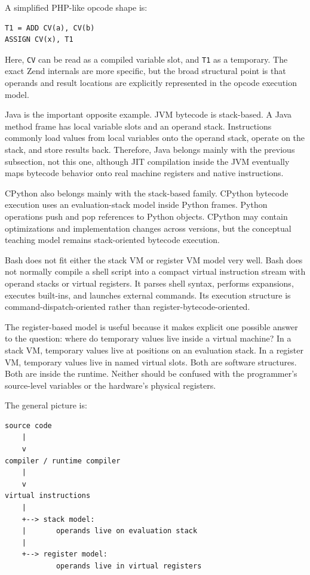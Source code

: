 A simplified PHP-like opcode shape is:

\begin{verbatim}
T1 = ADD CV(a), CV(b)
ASSIGN CV(x), T1
\end{verbatim}

Here, \texttt{CV} can be read as a compiled variable slot, and \texttt{T1} as a temporary. The exact Zend internals are more specific, but the broad structural point is that operands and result locations are explicitly represented in the opcode execution model.

Java is the important opposite example. JVM bytecode is stack-based. A Java method frame has local variable slots and an operand stack. Instructions commonly load values from local variables onto the operand stack, operate on the stack, and store results back. Therefore, Java belongs mainly with the previous subsection, not this one, although JIT compilation inside the JVM eventually maps bytecode behavior onto real machine registers and native instructions.

CPython also belongs mainly with the stack-based family. CPython bytecode execution uses an evaluation-stack model inside Python frames. Python operations push and pop references to Python objects. CPython may contain optimizations and implementation changes across versions, but the conceptual teaching model remains stack-oriented bytecode execution.

Bash does not fit either the stack VM or register VM model very well. Bash does not normally compile a shell script into a compact virtual instruction stream with operand stacks or virtual registers. It parses shell syntax, performs expansions, executes built-ins, and launches external commands. Its execution structure is command-dispatch-oriented rather than register-bytecode-oriented.

The register-based model is useful because it makes explicit one possible answer to the question: where do temporary values live inside a virtual machine? In a stack VM, temporary values live at positions on an evaluation stack. In a register VM, temporary values live in named virtual slots. Both are software structures. Both are inside the runtime. Neither should be confused with the programmer's source-level variables or the hardware's physical registers.

The general picture is:

\begin{verbatim}
source code
    |
    v
compiler / runtime compiler
    |
    v
virtual instructions
    |
    +--> stack model:
    |       operands live on evaluation stack
    |
    +--> register model:
            operands live in virtual registers
\end{verbatim}

